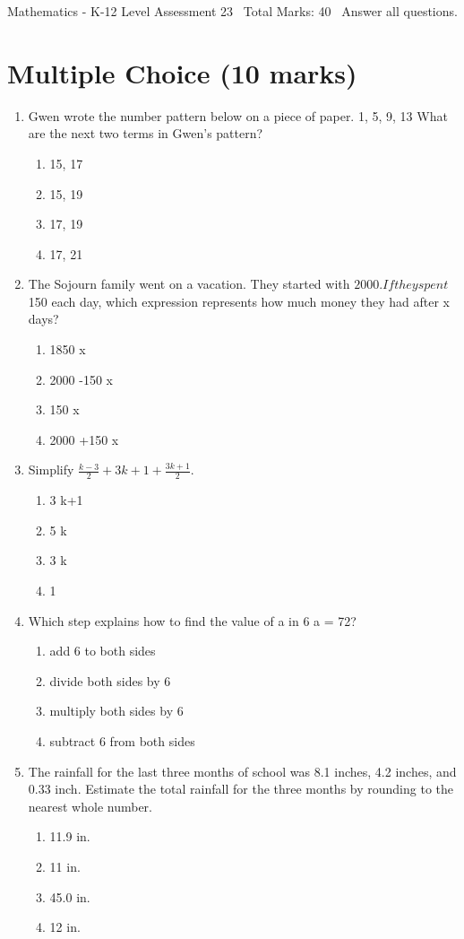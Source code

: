 \documentclass[12pt]{article}
\begin{document}
\begin{center}
Mathematics - K-12 Level Assessment 23 \
Total Marks: 40 \
Answer all questions.
\end{center}

\section*{Multiple Choice (10 marks)}
\begin{enumerate}[label=\arabic*.]
\item Gwen wrote the number pattern below on a piece of paper. 1, 5, 9, 13 What are the next two terms in Gwen's pattern?
\begin{enumerate}[label=(\alph*)]
    \item 15, 17
    \item 15, 19
    \item 17, 19
    \item 17, 21
\end{enumerate}
\item The Sojourn family went on a vacation. They started with $2000. If they spent $150 each day, which expression represents how much money they had after x days?
\begin{enumerate}[label=(\alph*)]
    \item 1850 x
    \item 2000 -150 x
    \item 150 x
    \item 2000 +150 x
\end{enumerate}
\item Simplify $\frac{k-3}{2} + 3 k+1+\frac{3 k+1}{2}$.
\begin{enumerate}[label=(\alph*)]
    \item 3 k+1
    \item 5 k
    \item 3 k
    \item 1
\end{enumerate}
\item Which step explains how to find the value of a in 6 a = 72?
\begin{enumerate}[label=(\alph*)]
    \item add 6 to both sides
    \item divide both sides by 6
    \item multiply both sides by 6
    \item subtract 6 from both sides
\end{enumerate}
\item The rainfall for the last three months of school was 8.1 inches, 4.2 inches, and 0.33 inch. Estimate the total rainfall for the three months by rounding to the nearest whole number.
\begin{enumerate}[label=(\alph*)]
    \item 11.9 in.
    \item 11 in.
    \item 45.0 in.
    \item 12 in.
\end{enumerate}
\end{enumerate}
\end{document}
